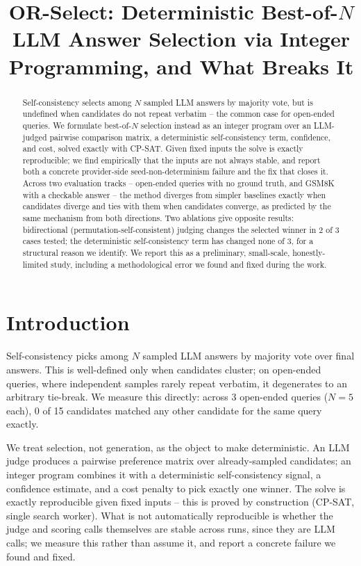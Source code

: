 \documentclass{article}
\title{OR-Select: Deterministic Best-of-$N$ LLM Answer Selection via Integer Programming, and What Breaks It}
\author{}
\date{}
\begin{document}
\maketitle

\begin{abstract}
Self-consistency selects among $N$ sampled LLM answers by majority vote,
but is undefined when candidates do not repeat verbatim -- the common
case for open-ended queries. We formulate best-of-$N$ selection instead
as an integer program over an LLM-judged pairwise comparison matrix, a
deterministic self-consistency term, confidence, and cost, solved exactly
with CP-SAT. Given fixed inputs the solve is exactly reproducible; we
find empirically that the inputs are not always stable, and report both
a concrete provider-side seed-non-determinism failure and the fix that
closes it. Across two evaluation tracks -- open-ended queries with no
ground truth, and GSM8K with a checkable answer -- the method diverges
from simpler baselines exactly when candidates diverge and ties with them
when candidates converge, as predicted by the same mechanism from both
directions. Two ablations give opposite results: bidirectional
(permutation-self-consistent) judging changes the selected winner in 2 of
3 cases tested; the deterministic self-consistency term has changed none
of 3, for a structural reason we identify. We report this as a
preliminary, small-scale, honestly-limited study, including a
methodological error we found and fixed during the work.
\end{abstract}

\section{Introduction}

Self-consistency \citep{wang2023selfconsistency} picks among $N$ sampled
LLM answers by majority vote over final answers. This is well-defined
only when candidates cluster; on open-ended queries, where independent
samples rarely repeat verbatim, it degenerates to an arbitrary tie-break.
We measure this directly: across 3 open-ended queries ($N=5$ each), 0 of
15 candidates matched any other candidate for the same query exactly.

We treat selection, not generation, as the object to make deterministic.
An LLM judge produces a pairwise preference matrix over already-sampled
candidates; an integer program combines it with a deterministic
self-consistency signal, a confidence estimate, and a cost penalty to
pick exactly one winner. The solve is exactly reproducible given fixed
inputs -- this is proved by construction (CP-SAT, single search worker).
What is not automatically reproducible is whether the judge and scoring
calls themselves are stable across runs, since they are LLM calls; we
measure this rather than assume it, and report a concrete failure we
found and fixed.
\end{document}
